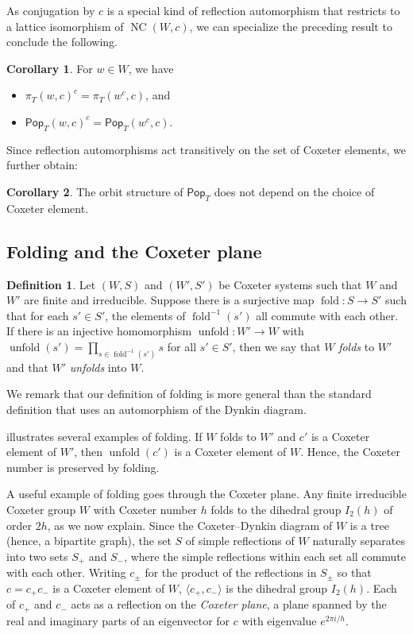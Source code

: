 \documentclass[10pt,a4paper]{amsart}
\theoremstyle{definition}
\newtheorem{coro}[coro]{Corollary}
\newtheorem{defi}[defi]{Definition}
\newcommand{\darkblue}{\color{darkblue}}
\newcommand{\defn}[1]{\emph{\darkblue #1}}
\newcommand{\pop}{\mathsf{Pop}}
\newcommand{\U}{{W'}}
\DeclareMathOperator{\NC}{NC}
\DeclareMathOperator{\fold}{fold}
\DeclareMathOperator{\unfold}{unfold}
\begin{document}
As conjugation by $c$ is a special kind of reflection automorphism that restricts to a lattice isomorphism of $\NC(W,c)$, we can specialize the preceding result to conclude the following.

\begin{coro} For $w \in W$, we have
\begin{itemize}
    \item  $\pi_T(w,c)^c = \pi_T(w^c,c)$, and
    \item $\pop_T(w,c)^c = \pop_T(w^c,c)$. 
\end{itemize}
\end{coro}


Since reflection automorphisms act transitively on the set of Coxeter elements, we further obtain:
\begin{coro}
\label{cor:orbit_structure}
The orbit structure of $\pop_T$ does not depend on the choice of Coxeter element.
\end{coro}

\subsection{Folding and the Coxeter plane}
\label{sec:folding}

 


\begin{defi}
Let $(W,S)$ and $(\U,S')$ be Coxeter systems such that $W$ and $W'$ are finite and irreducible. Suppose there is a surjective map $\fold:S\to S'$ such that for each $s'\in S'$, the elements of $\fold^{-1}(s')$ all commute with each other. If there is an injective homomorphism $\unfold:\U\to W$ with $\unfold(s')=\prod_{s\in\fold^{-1}(s')}s$ for all $s'\in S'$, then we say that $W$ \defn{folds} to $W'$ and that $W'$ \defn{unfolds} into $W$. 
\end{defi}

We remark that our definition of folding is more general than the standard definition that uses an automorphism of the Dynkin diagram. 

 illustrates several examples of folding. If $W$ folds to $\U$ and $c'$ is a Coxeter element of $\U$, then $\unfold(c')$ is a Coxeter element of $W$. Hence, the Coxeter number is preserved by folding.


A useful example of folding goes through the Coxeter plane.  Any finite irreducible Coxeter group $W$ with Coxeter number $h$ folds to the dihedral group $I_2(h)$ of order $2h$, as we now explain.  Since the Coxeter--Dynkin diagram of $W$ is a tree (hence, a bipartite graph), the set $S$ of simple reflections of $W$ naturally separates into two sets $S_+$ and $S_-$, where the simple reflections within each set all commute with each other.  Writing $c_\pm$ for the product of the reflections in $S_\pm$ so that $c = c_+ c_-$ is a Coxeter element of $W$, $\langle c_+,c_-\rangle$ is the dihedral group $I_2(h)$.  Each of $c_+$ and $c_-$ acts as a reflection on the \defn{Coxeter plane}, a plane spanned by the real and imaginary parts of an eigenvector for $c$ with eigenvalue $e^{2\pi i/h}$.
\end{document}
